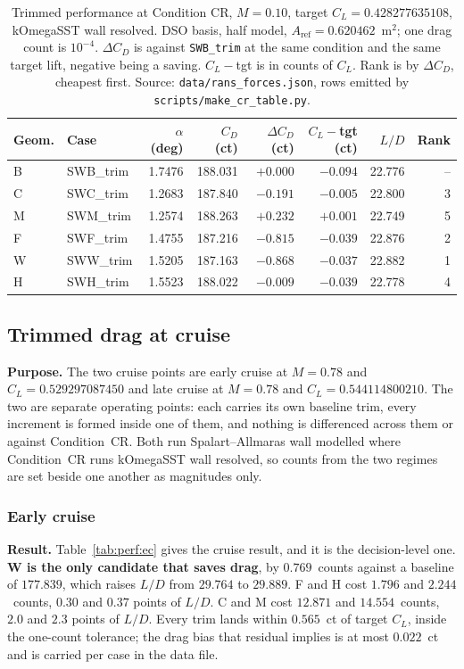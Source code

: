 \begin{table}[htbp]
\centering
\footnotesize
\caption{Trimmed performance at Condition CR, $M=0.10$, target $C_L=0.428277635108$, kOmegaSST
wall resolved. DSO basis, half model, $A_\mathrm{ref}=\num{0.620462}$~m$^2$; one drag count is
$10^{-4}$. $\Delta C_D$ is against \texttt{SWB\_trim} at the same condition and the same target
lift, negative being a saving. $C_L-$tgt is in counts of $C_L$. Rank is by $\Delta C_D$, cheapest
first. Source: \texttt{data/rans\_forces.json}, rows emitted by \texttt{scripts/make\_cr\_table.py}.}
\label{tab:perf:cr}
\begin{tabular}{llrrrrrr}
\toprule
Geom. & Case & $\alpha$ (deg) & $C_D$ (ct) & $\Delta C_D$ (ct) & $C_L-$tgt (ct) & $L/D$ & Rank \\
\midrule
B & SWB\_trim & 1.7476 & 188.031 & $+0.000$ & $-0.094$ & 22.776 & -- \\
C & SWC\_trim & 1.2683 & 187.840 & $-0.191$ & $-0.005$ & 22.800 & 3 \\
M & SWM\_trim & 1.2574 & 188.263 & $+0.232$ & $+0.001$ & 22.749 & 5 \\
F & SWF\_trim & 1.4755 & 187.216 & $-0.815$ & $-0.039$ & 22.876 & 2 \\
W & SWW\_trim & 1.5205 & 187.163 & $-0.868$ & $-0.037$ & 22.882 & 1 \\
H & SWH\_trim & 1.5523 & 188.022 & $-0.009$ & $-0.039$ & 22.778 & 4 \\
\bottomrule
\end{tabular}
\end{table}

\subsection{Trimmed drag at cruise}
\label{sec:cruise}
\textbf{Purpose.} The two cruise points are early cruise at $M = 0.78$ and
$C_L = 0.529297087450$ and late cruise at $M = 0.78$ and $C_L = 0.544114800210$. The two are
separate operating points: each carries its own baseline trim, every increment is formed inside
one of them, and nothing is differenced across them or against Condition~CR. Both run
Spalart--Allmaras wall modelled where Condition~CR runs kOmegaSST wall resolved, so counts from
the two regimes are set beside one another as magnitudes only.

\subsubsection{Early cruise}
\label{sec:perf:ec}
\textbf{Result.} Table~\ref{tab:perf:ec} gives the cruise result, and it is the decision-level
one. \textbf{W is the only candidate that saves drag}, by $0.769$~counts against a baseline of
$177.839$, which raises $L/D$ from $29.764$ to $29.889$. F and H cost $1.796$ and $2.244$~counts,
$0.30$ and $0.37$ points of $L/D$. C and M cost $12.871$ and $14.554$~counts, $2.0$ and $2.3$
points of $L/D$. Every trim lands within $0.565$~ct of target $C_L$, inside the one-count
tolerance; the drag bias that residual implies is at most $0.022$~ct and is carried per case in
the data file.

